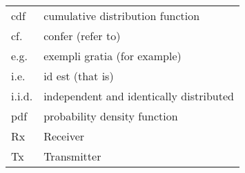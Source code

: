 \begin{longtable}{p{}p{}}
	cdf	&       cumulative distribution function \\
	cf.	&	confer (refer to) \\ 
 	e.g.	& 	exempli gratia (for example) \\
 	i.e.	& 	id est (that is) \\ 
 	i.i.d.	& 	independent and identically distributed \\ 
	pdf	&       probability density function \\
 	Rx	& 	Receiver \\
 	Tx	& 	Transmitter

\end{longtable}
  






